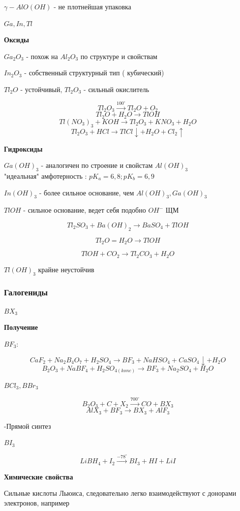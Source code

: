 $\gamma-AlO(OH)$ - не плотнейшая упаковка

$Ga, In, Tl$

\textbf{Оксиды}

$Ga_2O_3$ - похож на $Al_2O_3$ по структуре и свойствам

$In_2O_3$ - собственный структурный тип ( кубический)

$Tl_2O$ - устойчивый, $Tl_2O_3$ - сильный окислитель

$$Tl_2O_3 \xrightarrow{100^{\circ}} Tl_2O + O_2$$
$$Tl_2O + H_2O \rightarrow TlOH$$
$$Tl(NO_3)_3 + KOH \rightarrow Tl_2O_3 + KNO_3 + H_2O$$
$$Tl_2O_3 + HCl \rightarrow TlCl\downarrow + H_2O + Cl_2\uparrow$$

\textbf{Гидроксиды}

$Ga(OH)_3$ - аналогичен по строение и свойстам $Al(OH)_3$\\
"идеальная" амфотерность : $pK_a = 6,8 ; pK_b  = 6,9$

$In(OH)_3$ - более сильное основание, чем $Al(OH)_3, Ga(OH)_3$

$TlOH$ - сильное основание, ведет себя подобно $OH^-$ ЩМ

$$Tl_2SO_3 + Ba(OH)_2 \rightarrow BaSO_4 +TlOH$$

$$Tl_2O = H_2O \rightarrow TlOH$$

$$TlOH + CO_2 \rightarrow Tl_2CO_3 + H_2O$$

$Tl(OH)_3$ крайне неустойчив

\subsubsection*{Галогениды}

$BX_3$

\textbf{Получение}

$BF_3$:

$$CaF_2 + Na_2B_4O_7 + H_2SO_4 \rightarrow BF_3 + NaHSO_4 + CaSO_4\downarrow + H_2O$$
$$B_2O_3 + NaBF_4 + H_2SO_{4(konc)} \rightarrow BF_3 + Na_2SO_4 + H_2O$$

$BCl_3, BBr_3$

$$B_2O_3 + C + X_2 \xrightarrow{700^{\circ}} CO + BX_3$$
$$AlX_3 + BF_3 \rightarrow BX_3 + AlF_3$$

-Прямой синтез

$BI_3$

$$LiBH_4 + I_2 \xrightarrow{-78^{\circ}} BI_3 + HI + LiI$$

\textbf{Химические свойства}

Сильные кислоты Льюиса, следовательно легко взаимодействуют с донорами электронов, например

